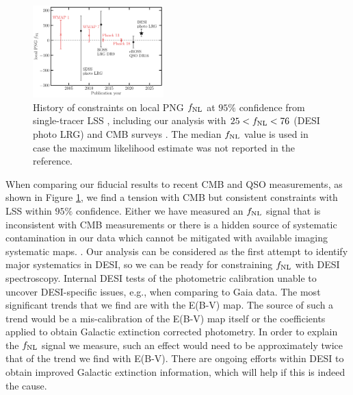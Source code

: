 \begin{figure}
    \centering
    \includegraphics[width=0.45\textwidth]{figures/fnl_history.pdf}
    \caption{ History of constraints on local PNG $f_{\rm NL}$ at $95\%$ confidence from single-tracer LSS \citep{slosar2008constraints,2013MNRAS.428.1116R, mueller2022primordial}, including our analysis with $25<f_{\rm NL}<76$ (DESI photo LRG) and CMB surveys \citep{Komatsu_2003, Komatsu_2010, planck13, akrami2019planck}. The median $f_{\rm NL}$ value is used in case the maximum likelihood estimate was not reported in the reference.}
    \label{fig:fnlhist}
\end{figure}

When comparing our fiducial results to recent CMB and QSO measurements, as shown in Figure \ref{fig:fnlhist}, we find a  tension with CMB but consistent constraints with LSS within $95\%$ confidence. Either we have measured an $f_{\rm NL}$ signal that is inconsistent with CMB measurements or there is a hidden source of systematic contamination in our data which cannot be mitigated with available imaging systematic maps. . Our analysis can be considered as the first attempt to identify major systematics in DESI, so we can be ready for constraining $f_{\rm NL}$ with DESI spectroscopy. Internal DESI tests of the photometric calibration  unable to uncover DESI-specific issues, e.g., when comparing to Gaia data. The most significant trends that we find are with the E(B-V) map. The source of such a trend would be a mis-calibration of the E(B-V) map itself or the coefficients applied to obtain Galactic extinction corrected photometry.  In order to explain the $f_{\rm NL}$ signal we measure, such an effect would need to be approximately twice that of the trend we find with E(B-V). There are ongoing efforts within DESI to obtain improved Galactic extinction information, which will help  if this is indeed the cause.


